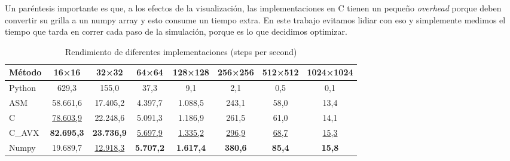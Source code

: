 \documentclass[a4paper]{article}
\begin{document}
Un paréntesis importante es que, a los efectos de la visualización, las implementaciones en C tienen un pequeño \textit{overhead} porque deben convertir su grilla a un numpy array y esto consume un tiempo extra. En este trabajo evitamos lidiar con eso y simplemente medimos el tiempo que tarda en correr cada paso de la simulación, porque es lo que decidimos optimizar.\\

\begin{table}[h]
    \centering
    \caption{Rendimiento de diferentes implementaciones (steps per second)}
    \label{tab:performance_results}
    \begin{tabular}{lccccccc}
        \toprule
        \textbf{Método} & \textbf{16×16}       & \textbf{32×32}       & \textbf{64×64}      & \textbf{128×128}    & \textbf{256×256}  & \textbf{512×512} & \textbf{1024×1024} \\
        \midrule
        Python          & 629,3                & 155,0                & 37,3                & 9,1                 & 2,1               & 0,5              & 0,1                \\
        ASM             & 58.661,6             & 17.405,2             & 4.397,7             & 1.088,5             & 243,1             & 58,0             & 13,4               \\
        C               & \underline{78.603,9} & 22.248,6             & 5.091,3             & 1.186,9             & 261,5             & 61,0             & 14,1               \\
        C\_AVX          & \textbf{82.695,3}    & \textbf{23.736,9}    & \underline{5.697,9} & \underline{1.335,2} & \underline{296,9} & \underline{68,7} & \underline{15,3}   \\
        Numpy           & 19.689,7             & \underline{12.918,3} & \textbf{5.707,2}    & \textbf{1.617,4}    & \textbf{380,6 }   & \textbf{85,4}    & \textbf{15,8}      \\
        \bottomrule
    \end{tabular}
\end{table}
\end{document}
